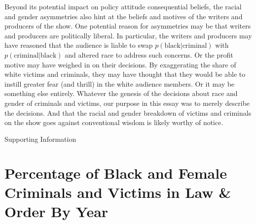 \documentclass[12pt, letterpaper]{article}
\begin{document}
Beyond its potential impact on policy attitude consequential beliefs, the racial and gender asymmetries also hint at the beliefs and motives of the writers and producers of the show. One potential reason for asymmetries may be that writers and producers are politically liberal. In particular, the writers and producers may have reasoned that the audience is liable to swap $p(\text{black}|\text{criminal})$ with $p(\text{criminal}|\text{black})$ \citep[see, for instance,][]{bordalo2016stereotypes, ahler2016parties} and altered race to address such concerns. Or the profit motive may have weighed in on their decisions. By exaggerating the share of white victims and criminals, they may have thought that they would be able to instill greater fear (and thrill) in the white audience members. Or it may be something else entirely. Whatever the genesis of the decisions about race and gender of criminals and victims, our purpose in this essay was to merely describe the decisions. And that the racial and gender breakdown of victims and criminals on the show goes against conventional wisdom is likely worthy of notice. 

\clearpage




\clearpage
\appendix
\renewcommand{\thesection}{SI \arabic{section}}
\renewcommand\thetable{\thesection.\arabic{table}}  
\renewcommand\thefigure{\thesection.\arabic{figure}}

\begin{center}
\Large{Supporting Information}
\end{center}

\section{Percentage of Black and Female Criminals and Victims in Law \& Order By Year}
\label{si_figs}
\end{document}
